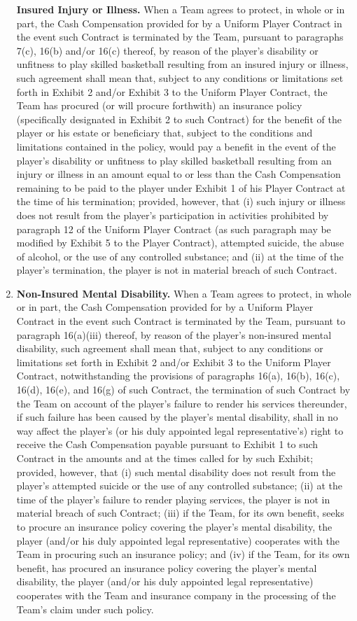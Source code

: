 \documentclass[
]{book}
\begin{document}
\begin{enumerate}
  \textbf{Insured Injury or Illness.} When a Team agrees to protect, in whole or in part, the Cash Compensation provided for by a Uniform Player Contract in the event such Contract is terminated by the Team, pursuant to paragraphs 7(c), 16(b) and/or 16(c) thereof, by reason of the player's disability or unfitness to play skilled basketball resulting from an insured injury or illness, such agreement shall mean that, subject to any conditions or limitations set forth in Exhibit 2 and/or Exhibit 3 to the Uniform Player Contract, the Team has procured (or will procure forthwith) an insurance policy (specifically designated in Exhibit 2 to such Contract) for the benefit of the player or his estate or beneficiary that, subject to the conditions and limitations contained in the policy, would pay a benefit in the event of the player's disability or unfitness to play skilled basketball resulting from an injury or illness in an amount equal to or less than the Cash Compensation remaining to be paid to the player under Exhibit 1 of his Player Contract at the time of his termination; provided, however, that (i) such injury or illness does not result from the player's participation in activities prohibited by paragraph 12 of the Uniform Player Contract (as such paragraph may be modified by Exhibit 5 to the Player Contract), attempted suicide, the abuse of alcohol, or the use of any controlled substance; and (ii) at the time of the player's termination, the player is not in material breach of such Contract.
\item
  \textbf{Non-Insured Mental Disability.} When a Team agrees to protect, in whole or in part, the Cash Compensation provided for by a Uniform Player Contract in the event such Contract is terminated by the Team, pursuant to paragraph 16(a)(iii) thereof, by reason of the player's non-insured mental disability, such agreement shall mean that, subject to any conditions or limitations set forth in Exhibit 2 and/or Exhibit 3 to the Uniform Player Contract, notwithstanding the provisions of paragraphs 16(a), 16(b), 16(c), 16(d), 16(e), and 16(g) of such Contract, the termination of such Contract by the Team on account of the player's failure to render his services thereunder, if such failure has been caused by the player's mental disability, shall in no way affect the player's (or his duly appointed legal representative's) right to receive the Cash Compensation payable pursuant to Exhibit 1 to such Contract in the amounts and at the times called for by such Exhibit; provided, however, that (i) such mental disability does not result from the player's attempted suicide or the use of any controlled substance; (ii) at the time of the player's failure to render playing services, the player is not in material breach of such Contract; (iii) if the Team, for its own benefit, seeks to procure an insurance policy covering the player's mental disability, the player (and/or his duly appointed legal representative) cooperates with the Team in procuring such an insurance policy; and (iv) if the Team, for its own benefit, has procured an insurance policy covering the player's mental disability, the player (and/or his duly appointed legal representative) cooperates with the Team and insurance company in the processing of the Team's claim under such policy.

\end{enumerate}
\end{document}
